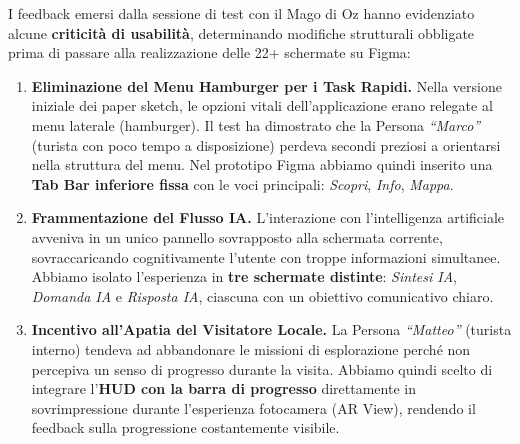 I feedback emersi dalla sessione di test con il Mago di Oz hanno evidenziato alcune \textbf{criticità di usabilità}, determinando modifiche strutturali obbligate prima di passare alla realizzazione delle 22+ schermate su Figma:

\begin{enumerate}[leftmargin=1.6em]

    \item \textbf{Eliminazione del Menu Hamburger per i Task Rapidi.}
    Nella versione iniziale dei paper sketch, le opzioni vitali dell'applicazione erano relegate al menu laterale (hamburger). Il test ha dimostrato che la Persona \textit{``Marco''} (turista con poco tempo a disposizione) perdeva secondi preziosi a orientarsi nella struttura del menu. Nel prototipo Figma abbiamo quindi inserito una \textbf{Tab Bar inferiore fissa} con le voci principali: \textit{Scopri}, \textit{Info}, \textit{Mappa}.

    \item \textbf{Frammentazione del Flusso IA.}
    L'interazione con l'intelligenza artificiale avveniva in un unico pannello sovrapposto alla schermata corrente, sovraccaricando cognitivamente l'utente con troppe informazioni simultanee. Abbiamo isolato l'esperienza in \textbf{tre schermate distinte}: \textit{Sintesi IA}, \textit{Domanda IA} e \textit{Risposta IA}, ciascuna con un obiettivo comunicativo chiaro.

    \item \textbf{Incentivo all'Apatia del Visitatore Locale.}
    La Persona \textit{``Matteo''} (turista interno) tendeva ad abbandonare le missioni di esplorazione perché non percepiva un senso di progresso durante la visita. Abbiamo quindi scelto di integrare l'\textbf{HUD con la barra di progresso} direttamente in sovrimpressione durante l'esperienza fotocamera (AR View), rendendo il feedback sulla progressione costantemente visibile.

\end{enumerate}
